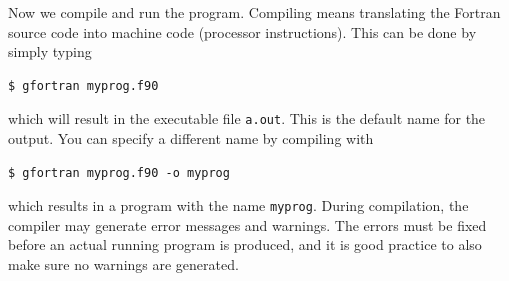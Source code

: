 \documentclass[openany,oneside]{report}
\begin{document}
Now we compile and run the program.
Compiling means translating the Fortran source code into machine code (processor instructions).
This can be done by simply typing
\begin{verbatim}
$ gfortran myprog.f90
\end{verbatim}
which will result in the executable file \texttt{a.out}.
This is the default name for the output.
You can specify a different name by compiling with
\begin{verbatim}
$ gfortran myprog.f90 -o myprog
\end{verbatim}
which results in a program with the name \texttt{myprog}.
During compilation, the compiler may generate error messages and warnings.
The errors must be fixed before an actual running program is produced, and it is good practice to also make sure no warnings are generated.
\end{document}
